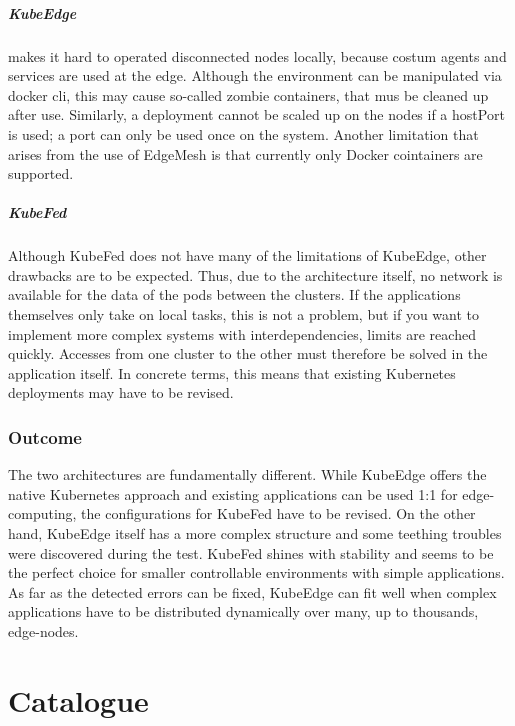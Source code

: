 \documentclass[MSC,Master,english]{twbook}%
\begin{document}
\paragraph{KubeEdge} makes it hard to operated disconnected nodes locally, because costum agents and services are used at the edge. Although the environment can be manipulated via docker cli, this may cause so-called zombie containers, that mus be cleaned up after use. Similarly, a deployment cannot be scaled up on the nodes if a hostPort is used; a port can only be used once on the system. Another limitation that arises from the use of EdgeMesh is that currently only Docker cointainers are supported.

\paragraph{KubeFed} Although KubeFed does not have many of the limitations of KubeEdge, other drawbacks are to be expected. Thus, due to the architecture itself, no network is available for the data of the pods between the clusters. If the applications themselves only take on local tasks, this is not a problem, but if you want to implement more complex systems with interdependencies, limits are reached quickly. Accesses from one cluster to the other must therefore be solved in the application itself. In concrete terms, this means that existing Kubernetes deployments may have to be revised.

\subsection{Outcome} The two architectures are fundamentally different. While KubeEdge offers the native Kubernetes approach and existing applications can be used 1:1 for edge-computing, the configurations for KubeFed have to be revised. On the other hand, KubeEdge itself has a more complex structure and some teething troubles were discovered during the test. KubeFed shines with stability and seems to be the perfect choice for smaller controllable environments with simple applications. As far as the detected errors can be fixed, KubeEdge can fit well when complex applications have to be distributed dynamically over many, up to thousands, edge-nodes.

\chapter{Catalogue}
\label{chap:catalogue}
\end{document}
